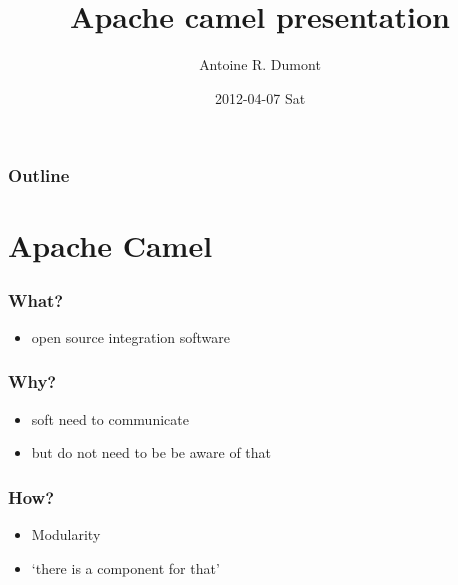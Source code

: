 \documentclass[bigger]{beamer}
\title{Apache camel presentation}
\author{Antoine R. Dumont}
\date{2012-04-07 Sat}
\begin{document}
\maketitle

\begin{frame}
\frametitle{Outline}
\setcounter{tocdepth}{3}
\tableofcontents
\end{frame}



\section{Apache Camel}
\label{sec-1}
\begin{frame}
\frametitle{What?}
\label{sec-1-1}

\begin{itemize}
\item open source integration software
\end{itemize}
\end{frame}
\begin{frame}
\frametitle{Why?}
\label{sec-1-2}

\begin{itemize}
\item soft need to communicate
\item but do not need to be be aware of that
\end{itemize}
\end{frame}
\begin{frame}
\frametitle{How?}
\label{sec-1-3}
\begin{itemize}

\item Modularity
\label{sec-1-3-1}%

\item `there is a component for that'
\label{sec-1-3-2}%
\end{itemize} %
\end{frame}
\end{document}
